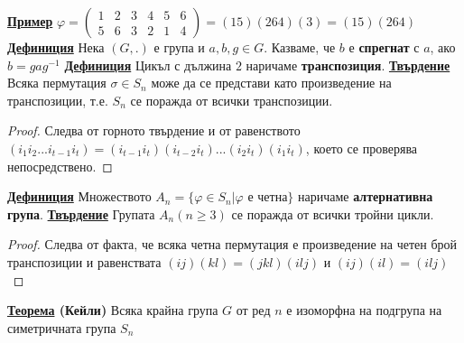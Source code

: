 \documentclass{article}
\begin{document}
\textbf{\underline{Пример}}
$\varphi = \begin{pmatrix}
    1 & 2 & 3 & 4 & 5 & 6 \\
    5 & 6 & 3 & 2 & 1 & 4
\end{pmatrix} = (15)(264)(3) = (15)(264)$ \newline\newline
\textbf{\underline{Дефиниция}}
Нека $(G, .)$ е група и $a, b, g \in G$. Казваме, че $b$ е \textbf{спрегнат} с $a$, ако $b = gag^{-1}$ \newline\newline
\textbf{\underline{Дефиниция}}
Цикъл с дължина $2$ наричаме \textbf{транспозиция}. \newline\newline
\textbf{\underline{Твърдение}} \newline
Всяка пермутация $\sigma \in S_n$ може да се представи като произведение на транспозиции, т.е. $S_n$ се поражда от всички
транспозиции.
\begin{proof}
Следва от горното твърдение и от равенството $(i_1i_2...i_{t - 1}i_t) = (i_{t - 1}i_t)(i_{t - 2}i_t)...(i_2i_t)(i_1i_t)$, което
се проверява непосредствено.
\end{proof}
\textbf{\underline{Дефиниция}}
Множеството $A_n = \{\varphi \in S_n | \varphi \text{ е четна}\}$ наричаме \textbf{алтернативна група}. \newline\newline
\textbf{\underline{Твърдение}} \newline
Групата $A_n (n \ge 3)$ се поражда от всички тройни цикли.
\begin{proof}
Следва от факта, че всяка четна пермутация е произведение на четен брой транспозиции и равенствата $(ij)(kl) = (jkl)(ilj)$ и
$(ij)(il) = (ilj)$
\end{proof}
\textbf{\underline{Теорема} (Кейли)} \newline
Всяка крайна група $G$ от ред $n$ е изоморфна на подгрупа на симетричната група $S_n$
\end{document}
